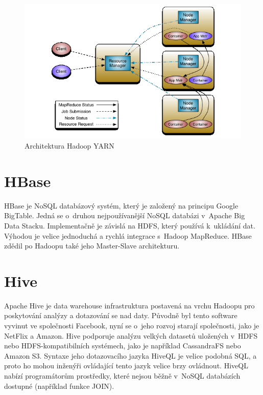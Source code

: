 \begin{figure}[h]
\centering
\includegraphics[scale=0.7]{images/yarn_architecture}
\caption{Architektura Hadoop YARN}
\label{fig:yarn}

\end{figure}



\newpage 

\section{HBase}
HBase je NoSQL databázový systém, který je založený na principu Google BigTable. Jedná se o~druhou nejpoužívanější NoSQL databázi v~Apache Big Data Stacku. Implementačně je závislá na HDFS, který používá k~ukládání dat. Výhodou je velice jednoduchá a rychlá integrace s~Hadoop MapReduce. HBase zdědil po Hadoopu také jeho Master-Slave architekturu.


\section{Hive}


Apache Hive je data warehouse infrastruktura postavená na vrchu Hadoopu pro poskytování analýzy a dotazování se nad daty. Původně byl tento software vyvinut ve společnosti Facebook, nyní se o~jeho rozvoj starají společnosti, jako je NetFlix a Amazon. Hive podporuje analýzu velkých datasetů uložených v~HDFS nebo HDFS-kompatibilních systémech, jako je například CassandraFS nebo Amazon S3. Syntaxe jeho dotazovacího jazyka HiveQL je velice podobná SQL, a proto ho mohou inženýři ovládající tento jazyk velice brzy ovládnout. HiveQL nabízí programátorům prostředky, které nejsou běžně v~NoSQL databázích dostupné (například funkce JOIN). 

